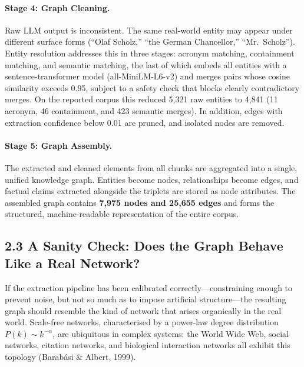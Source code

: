 \documentclass[11pt]{article}
\begin{document}
\paragraph{Stage 4: Graph Cleaning.}
Raw LLM output is inconsistent. The same real-world entity may appear under different surface forms (``Olaf Scholz,'' ``the German Chancellor,'' ``Mr.\ Scholz''). Entity resolution addresses this in three stages: acronym matching, containment matching, and semantic matching, the last of which embeds all entities with a sentence-transformer model (all-MiniLM-L6-v2) and merges pairs whose cosine similarity exceeds 0.95, subject to a safety check that blocks clearly contradictory merges. On the reported corpus this reduced 5{,}321 raw entities to 4{,}841 (11 acronym, 46 containment, and 423 semantic merges). In addition, edges with extraction confidence below 0.01 are pruned, and isolated nodes are removed.

\paragraph{Stage 5: Graph Assembly.}
The extracted and cleaned elements from all chunks are aggregated into a single, unified knowledge graph. Entities become nodes, relationships become edges, and factual claims extracted alongside the triplets are stored as node attributes. The assembled graph contains \textbf{7{,}975 nodes and 25{,}655 edges} and forms the structured, machine-readable representation of the entire corpus.

\subsection{2.3 A Sanity Check: Does the Graph Behave Like a Real Network?}

If the extraction pipeline has been calibrated correctly---constraining enough to prevent noise, but not so much as to impose artificial structure---the resulting graph should resemble the kind of network that arises organically in the real world. Scale-free networks, characterised by a power-law degree distribution $P(k) \sim k^{-\alpha}$, are ubiquitous in complex systems: the World Wide Web, social networks, citation networks, and biological interaction networks all exhibit this topology (Barab\'{a}si \& Albert, 1999).
\end{document}
